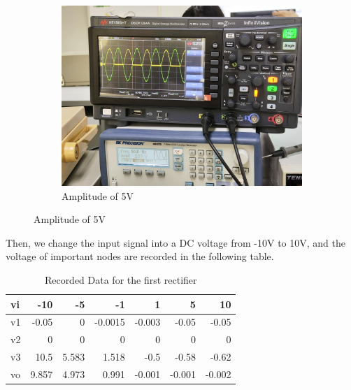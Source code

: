 \begin{itemize}
\begin{figure}[H]
\begin{subfigure}{0.3\textwidth}
                \centering
                \includegraphics[width=1\linewidth]{Experiment_12/Images/RetA 50-5-min.jpg}
                \caption{Amplitude of 5V}
                \label{l125wf1}
            \end{subfigure}
        \end{figure}

        Then, we change the input signal into a DC voltage from -10V to 10V, and the voltage of important nodes are recorded in the following table.
        \begin{table}[H]
            \centering
            \begin{tabular}{l|rrrrrr}
                \midrule
                vi    & -10   & -5    & -1    & 1     & 5     & 10 \\
                \midrule
                v1    & -0.05 & 0     & -0.0015 & -0.003 & -0.05 & -0.05 \\
                v2    & 0     & 0     & 0     & 0     & 0     & 0 \\
                v3    & 10.5  & 5.583 & 1.518 & -0.5  & -0.58 & -0.62 \\
                vo    & 9.857 & 4.973 & 0.991 & -0.001 & -0.001 & -0.002 \\
                \bottomrule
                \end{tabular}%
            \caption{Recorded Data for the first rectifier}
            \label{tab:12a}
        \end{table}
    \end{itemize}

